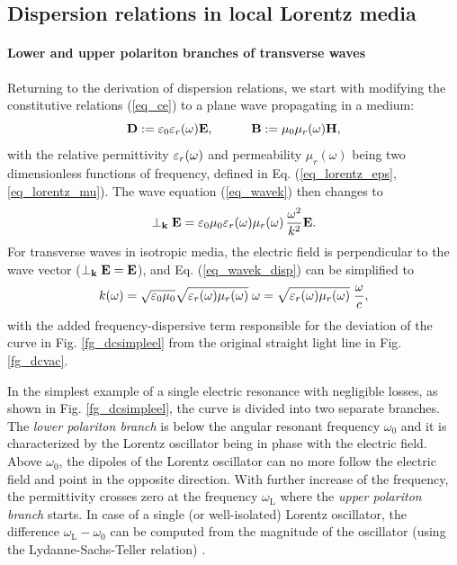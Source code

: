 
\subsection{Dispersion relations in local Lorentz media} \label{disp_rel_local_media}
\paragraph{Lower and upper polariton branches of transverse waves} %
Returning to the derivation of dispersion relations, we start with modifying the constitutive relations (\ref{eq_ce}) to a plane wave propagating in a medium:
\begin{equation}		\mathbf{D} := \varepsilon_0\varepsilon_r(\omega)	\mathbf{E}, \quad\quad\quad						\mathbf{B} := \mu_0\mu_r(\omega)		\mathbf{H},				 \label{eq_ce2}\end{equation}
with the relative permittivity $\varepsilon_r(\omega)$ and permeability $\mu_r(\omega)$ being two dimensionless functions of frequency, defined in Eq. (\ref{eq_lorentz_eps}, \ref{eq_lorentz_mu}). 
The wave equation (\ref{eq_wavek}) then changes to
\begin{equation}  \perp_{\mathbf{k}}\mathbf{E} = \varepsilon_0 \mu_0  \varepsilon_r(\omega) \mu_r(\omega) \, \frac{ \omega^{2}}{k^2} \mathbf{E}.  \label{eq_wavek_disp}\end{equation}
	For transverse waves in isotropic media, the electric field is perpendicular to the wave vector ($\perp_{\mathbf{k}}\mathbf{E} = \mathbf{E}$), and Eq. (\ref{eq_wavek_disp}) can be simplified to  
\begin{equation} k(\omega) = \sqrt{\varepsilon_0 \mu_0} \sqrt{\varepsilon_r(\omega) \mu_{r}(\omega)}\;\omega = \sqrt{\varepsilon_r(\omega) \mu_{r}(\omega)}\; \frac{\omega}{c}, \label{eq_dispeq_loc}\end{equation}
with the added frequency-dispersive term responsible for the deviation of the curve in Fig. \ref{fg_dcsimpleel} from the original straight light line in Fig. \ref{fg_dcvac}. 

In the simplest example of a single electric resonance with negligible losses, as shown in Fig. \ref{fg_dcsimpleel}, the curve is divided into two separate branches. The \textit{lower polariton branch} is below the angular resonant frequency $\omega_0$ and it is characterized by the Lorentz oscillator being in phase with the electric field. Above $\omega_0$, the dipoles of the Lorentz oscillator can no more follow the electric field and point in the opposite direction. With further increase of the frequency, the permittivity crosses zero at the frequency $\omega_{\text{L}}$ where the \textit{upper polariton branch} starts. In case of a single (or well-isolated) Lorentz oscillator, the difference $\omega_{\text{L}} - \omega_0$ can be computed from the magnitude of the oscillator (using the Lydanne-Sachs-Teller relation) \cite{klingshirn2007semiconductor}.

